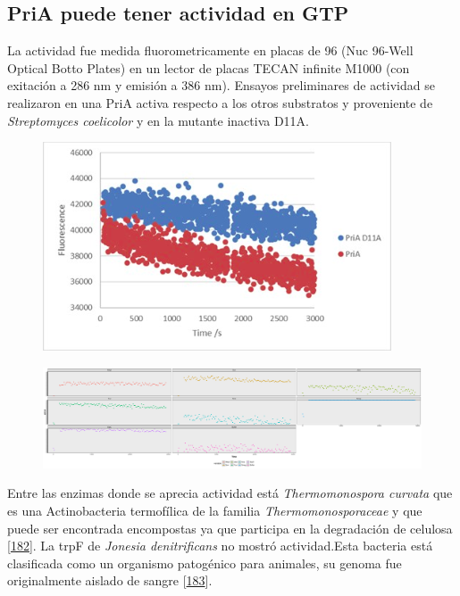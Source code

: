 \documentclass[12pt,twoside]{reedthesis}
\begin{document}
  \subsection{PriA puede tener actividad en
  GTP}\label{pria-puede-tener-actividad-en-gtp}
  
  La actividad fue medida fluorometricamente en placas de 96 (Nuc 96-Well
  Optical Botto Plates) en un lector de placas TECAN infinite M1000 (con
  exitación a 286 nm y emisión a 386 nm). Ensayos preliminares de
  actividad se realizaron en una PriA activa respecto a los otros
  substratos y proveniente de \emph{Streptomyces coelicolor} y en la
  mutante inactiva D11A.
  
  \begin{figure}[h!tbp]
  \centering
  \includegraphics[angle = 0,scale = 0.8]{chapter4/MutantControl.png}
  \caption[Scoe and non functional Scoe PriA acting on dGTP]{\footnotesize{}}
  \label{fig:PriARutas1}
  \end{figure}
  
  \begin{figure}[h!tbp]
  \centering
  \includegraphics[angle = 0,scale = 0.6]{chapter4/GTPCinetica.pdf}
  \caption[Scoe and non functional Scoe PriA acting on dGTP]{\footnotesize{}}
  \label{fig:PriARutas2}
  \end{figure}
  
  \clearpage  
  
  Entre las enzimas donde se aprecia actividad está \emph{Thermomonospora
  curvata} que es una Actinobacteria termofílica de la familia
  \emph{Thermomonosporaceae} y que puede ser encontrada encompostas ya que
  participa en la degradación de celulosa
  {[}\protect\hyperlink{ref-chertkov_complete_2011}{182}{]}. La trpF de
  \emph{Jonesia denitrificans} no mostró actividad.Esta bacteria está
  clasificada como un organismo patogénico para animales, su genoma fue
  originalmente aislado de sangre
  {[}\protect\hyperlink{ref-pukall_complete_2009}{183}{]}.
  
\end{document}
